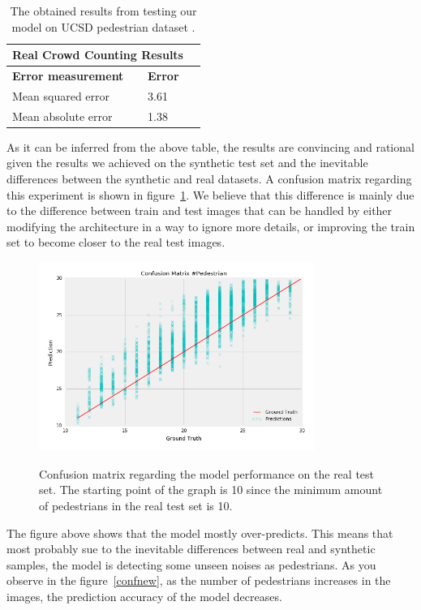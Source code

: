 \begin{table}[H]
\centering
\small\sffamily
\begin{tabular}{llr}
\multicolumn{2}{c}{\textbf{\textbf{Real Crowd Counting Results}}} \\
\bottomrule
\textbf{Error measurement}        & \textbf{Error} \\
\bottomrule
Mean squared error       & 3.61  \\
Mean absolute error      & 1.38  \\
\bottomrule
\end{tabular}
\caption{The obtained results from testing our model on UCSD pedestrian dataset \cite{chan2008privacy}. }
\label{tab:ucsdreal}
\end{table} 

As it can be inferred from the above table, the results are convincing and rational given the results we achieved on the synthetic test set and the inevitable differences between the synthetic and real datasets. A confusion matrix regarding this experiment is shown in figure~\ref{confnew2}. We believe that this difference is mainly due to the difference between train and test images that can be handled by either modifying the architecture in a way to ignore more details, or improving the train set to become closer to the real test images. 

\begin{figure}[H]
	\centering
	{\includegraphics[width=0.8\textwidth]{images/realtestfig}}
	\caption{Confusion matrix regarding the model performance on the real test set. The starting point of the graph is 10 since the minimum amount of pedestrians in the real test set is 10.}
	\label{confnew2}
\end{figure}
The figure above shows that the model mostly over-predicts. This means that most probably sue to the inevitable differences between real and synthetic samples, the model is detecting some unseen noises as pedestrians. As you observe in the figure~\ref{confnew}, as the number of pedestrians increases in the images, the prediction accuracy of the model decreases.  


